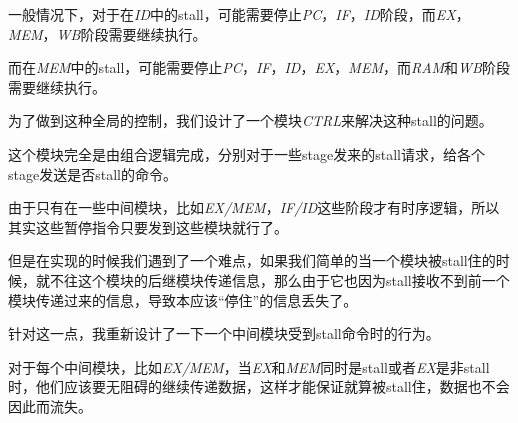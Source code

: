 \documentclass[titlepage]{article}
\begin{document}
一般情况下，对于在\emph{ID}中的stall，可能需要停止\emph{PC}，\emph{IF}，\emph{ID}阶段，而\emph{EX}，\emph{MEM}，\emph{WB}阶段需要继续执行。

而在\emph{MEM}中的stall，可能需要停止\emph{PC}，\emph{IF}，\emph{ID}，\emph{EX}，\emph{MEM}，而\emph{RAM}和\emph{WB}阶段需要继续执行。

为了做到这种全局的控制，我们设计了一个模块\emph{CTRL}来解决这种stall的问题。

这个模块完全是由组合逻辑完成，分别对于一些stage发来的stall请求，给各个stage发送是否stall的命令。

由于只有在一些中间模块，比如\emph{EX/MEM}，\emph{IF/ID}这些阶段才有时序逻辑，所以其实这些暂停指令只要发到这些模块就行了。

但是在实现的时候我们遇到了一个难点，如果我们简单的当一个模块被stall住的时候，就不往这个模块的后继模块传递信息，那么由于它也因为stall接收不到前一个模块传递过来的信息，导致本应该“停住”的信息丢失了。

针对这一点，我重新设计了一下一个中间模块受到stall命令时的行为。

对于每个中间模块，比如\emph{EX/MEM}，当\emph{EX}和\emph{MEM}同时是stall或者\emph{EX}是非stall时，他们应该要无阻碍的继续传递数据，这样才能保证就算被stall住，数据也不会因此而流失。
\end{document}
